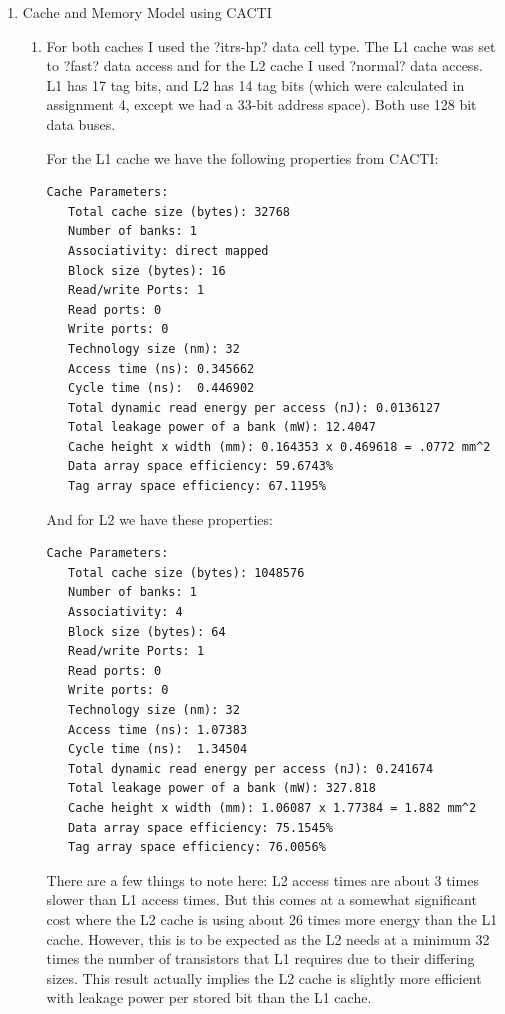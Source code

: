 \documentclass[a4paper, 11pt]{exam}
\begin{document}
\begin{enumerate}
\item Cache and Memory Model using CACTI

\begin{enumerate}
\item For both caches I used the ?itrs-hp? data cell type. The L1 cache was set to ?fast? data access and for the L2 cache I used ?normal? data access. L1 has 17 tag bits, and L2 has 14 tag bits (which were calculated in assignment 4, except we had a 33-bit address space). Both use 128 bit data buses.

For the L1 cache we have the following properties from CACTI:
\begin{verbatim}
Cache Parameters:
   Total cache size (bytes): 32768
   Number of banks: 1
   Associativity: direct mapped
   Block size (bytes): 16
   Read/write Ports: 1
   Read ports: 0
   Write ports: 0
   Technology size (nm): 32
   Access time (ns): 0.345662
   Cycle time (ns):  0.446902
   Total dynamic read energy per access (nJ): 0.0136127
   Total leakage power of a bank (mW): 12.4047
   Cache height x width (mm): 0.164353 x 0.469618 = .0772 mm^2
   Data array space efficiency: 59.6743%
   Tag array space efficiency: 67.1195%
\end{verbatim}
And for L2 we have these properties:
\begin{verbatim}
Cache Parameters:
   Total cache size (bytes): 1048576
   Number of banks: 1
   Associativity: 4
   Block size (bytes): 64
   Read/write Ports: 1
   Read ports: 0
   Write ports: 0
   Technology size (nm): 32
   Access time (ns): 1.07383
   Cycle time (ns):  1.34504
   Total dynamic read energy per access (nJ): 0.241674
   Total leakage power of a bank (mW): 327.818
   Cache height x width (mm): 1.06087 x 1.77384 = 1.882 mm^2
   Data array space efficiency: 75.1545%
   Tag array space efficiency: 76.0056%
\end{verbatim}
There are a few things to note here: L2 access times are about 3 times slower
than L1 access times. But this comes at a somewhat significant cost where the
L2 cache is using about 26 times more energy than the L1 cache. However, this is
to be expected as the L2 needs at a minimum 32 times the number of
transistors that L1 requires due to their differing sizes. This result actually
implies the L2 cache is slightly more efficient with leakage power per stored
bit than the L1 cache.


\end{enumerate}
\end{enumerate}
\end{document}
